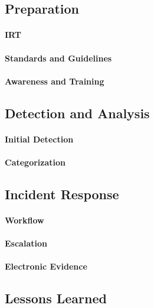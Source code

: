 \subsection{Preparation}
\paragraph{\acl{IRT}}
\paragraph{Standards and Guidelines}
\paragraph{Awareness and Training}
\subsection{Detection and Analysis}
\paragraph{Initial Detection}
\paragraph{Categorization}
\subsection{Incident Response}
\paragraph{Workflow}
\paragraph{Escalation}
\paragraph{Electronic Evidence}
\subsection{Lessons Learned}